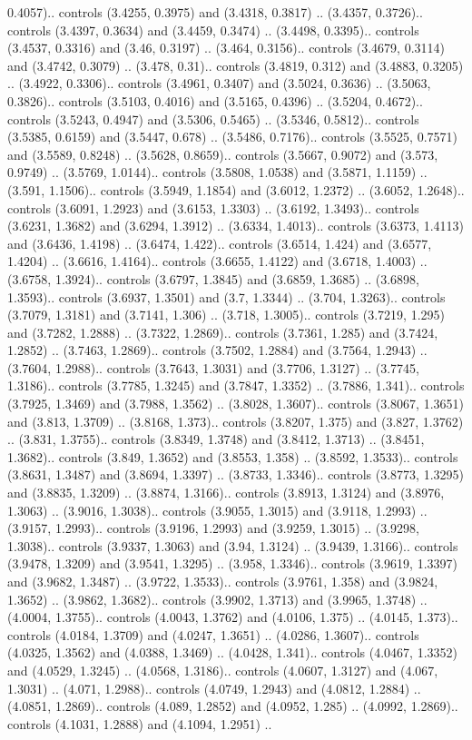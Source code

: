 0.4057).. controls (3.4255, 0.3975) and (3.4318, 0.3817) .. (3.4357, 0.3726).. controls (3.4397, 0.3634) and (3.4459, 0.3474) .. (3.4498, 0.3395).. controls (3.4537, 0.3316) and (3.46, 0.3197) .. (3.464, 0.3156).. controls (3.4679, 0.3114) and (3.4742, 0.3079) .. (3.478, 0.31).. controls (3.4819, 0.312) and (3.4883, 0.3205) .. (3.4922, 0.3306).. controls (3.4961, 0.3407) and (3.5024, 0.3636) .. (3.5063, 0.3826).. controls (3.5103, 0.4016) and (3.5165, 0.4396) .. (3.5204, 0.4672).. controls (3.5243, 0.4947) and (3.5306, 0.5465) .. (3.5346, 0.5812).. controls (3.5385, 0.6159) and (3.5447, 0.678) .. (3.5486, 0.7176).. controls (3.5525, 0.7571) and (3.5589, 0.8248) .. (3.5628, 0.8659).. controls (3.5667, 0.9072) and (3.573, 0.9749) .. (3.5769, 1.0144).. controls (3.5808, 1.0538) and (3.5871, 1.1159) .. (3.591, 1.1506).. controls (3.5949, 1.1854) and (3.6012, 1.2372) .. (3.6052, 1.2648).. controls (3.6091, 1.2923) and (3.6153, 1.3303) .. (3.6192, 1.3493).. controls (3.6231, 1.3682) and (3.6294, 1.3912) .. (3.6334, 1.4013).. controls (3.6373, 1.4113) and (3.6436, 1.4198) .. (3.6474, 1.422).. controls (3.6514, 1.424) and (3.6577, 1.4204) .. (3.6616, 1.4164).. controls (3.6655, 1.4122) and (3.6718, 1.4003) .. (3.6758, 1.3924).. controls (3.6797, 1.3845) and (3.6859, 1.3685) .. (3.6898, 1.3593).. controls (3.6937, 1.3501) and (3.7, 1.3344) .. (3.704, 1.3263).. controls (3.7079, 1.3181) and (3.7141, 1.306) .. (3.718, 1.3005).. controls (3.7219, 1.295) and (3.7282, 1.2888) .. (3.7322, 1.2869).. controls (3.7361, 1.285) and (3.7424, 1.2852) .. (3.7463, 1.2869).. controls (3.7502, 1.2884) and (3.7564, 1.2943) .. (3.7604, 1.2988).. controls (3.7643, 1.3031) and (3.7706, 1.3127) .. (3.7745, 1.3186).. controls (3.7785, 1.3245) and (3.7847, 1.3352) .. (3.7886, 1.341).. controls (3.7925, 1.3469) and (3.7988, 1.3562) .. (3.8028, 1.3607).. controls (3.8067, 1.3651) and (3.813, 1.3709) .. (3.8168, 1.373).. controls (3.8207, 1.375) and (3.827, 1.3762) .. (3.831, 1.3755).. controls (3.8349, 1.3748) and (3.8412, 1.3713) .. (3.8451, 1.3682).. controls (3.849, 1.3652) and (3.8553, 1.358) .. (3.8592, 1.3533).. controls (3.8631, 1.3487) and (3.8694, 1.3397) .. (3.8733, 1.3346).. controls (3.8773, 1.3295) and (3.8835, 1.3209) .. (3.8874, 1.3166).. controls (3.8913, 1.3124) and (3.8976, 1.3063) .. (3.9016, 1.3038).. controls (3.9055, 1.3015) and (3.9118, 1.2993) .. (3.9157, 1.2993).. controls (3.9196, 1.2993) and (3.9259, 1.3015) .. (3.9298, 1.3038).. controls (3.9337, 1.3063) and (3.94, 1.3124) .. (3.9439, 1.3166).. controls (3.9478, 1.3209) and (3.9541, 1.3295) .. (3.958, 1.3346).. controls (3.9619, 1.3397) and (3.9682, 1.3487) .. (3.9722, 1.3533).. controls (3.9761, 1.358) and (3.9824, 1.3652) .. (3.9862, 1.3682).. controls (3.9902, 1.3713) and (3.9965, 1.3748) .. (4.0004, 1.3755).. controls (4.0043, 1.3762) and (4.0106, 1.375) .. (4.0145, 1.373).. controls (4.0184, 1.3709) and (4.0247, 1.3651) .. (4.0286, 1.3607).. controls (4.0325, 1.3562) and (4.0388, 1.3469) .. (4.0428, 1.341).. controls (4.0467, 1.3352) and (4.0529, 1.3245) .. (4.0568, 1.3186).. controls (4.0607, 1.3127) and (4.067, 1.3031) .. (4.071, 1.2988).. controls (4.0749, 1.2943) and (4.0812, 1.2884) .. (4.0851, 1.2869).. controls (4.089, 1.2852) and (4.0952, 1.285) .. (4.0992, 1.2869).. controls (4.1031, 1.2888) and (4.1094, 1.2951) .. 